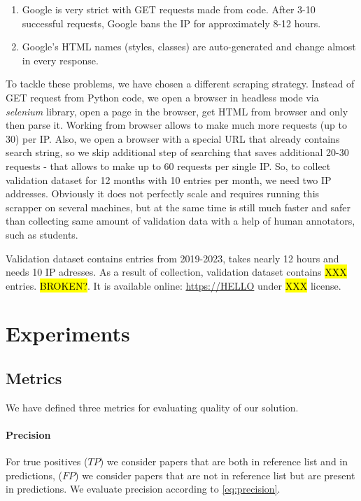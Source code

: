 \documentclass{article}
\begin{document}
        \begin{enumerate}
            \item Google is very strict with GET requests made from code. After 3-10 successful requests, Google bans the IP for approximately 8-12 hours.
            \item Google's HTML names (styles, classes) are auto-generated and change almost in every response. 
        \end{enumerate}

        To tackle these problems, we have chosen a different scraping strategy. Instead of GET request from Python code, we open a browser in headless mode via \textit{selenium} library, open a page in the browser, get HTML from browser and only then parse it. Working from browser allows to make much more requests (up to 30) per IP. Also, we open a browser with a special URL that already contains search string, so we skip additional step of searching that saves additional 20-30 requests - that allows to make up to 60 requests per single IP. So, to collect validation dataset for 12 months with 10 entries per month, we need two IP addresses. Obviously it does not perfectly scale and requires running this scrapper on several machines, but at the same time is still much faster and safer than collecting same amount of validation data with a help of human annotators, such as students.

        Validation dataset contains entries from 2019-2023, takes nearly 12 hours and needs 10 IP adresses. As a result of collection, validation dataset contains \hl{XXX} entries. \hl{BROKEN?}. It is available online: \url{https://HELLO} under \hl{XXX} license.

\section{Experiments}

    \subsection{Metrics}
    
        We have defined three metrics for evaluating quality of our solution.

        \paragraph{Precision}
       
            For true positives (\(TP\)) we consider papers that are both in reference list and in predictions, (\(FP\)) we consider papers that are not in reference list but are present in predictions. We evaluate precision according to \ref{eq:precision}.
\end{document}
